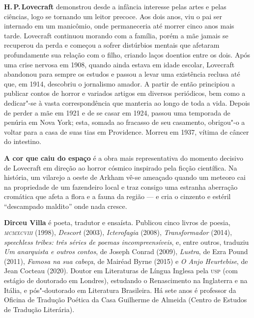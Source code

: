 \textbf{H.\,P.\,Lovecraft} demonstrou desde a infância interesse pelas artes e pelas ciências, logo se tornando um leitor precoce. Aos dois anos, viu o pai ser internado em um manicômio, onde permaneceria até morrer cinco anos mais tarde. Lovecraft continuou morando com a família, porém a mãe jamais se recuperou da perda e começou a sofrer distúrbios mentais que afetaram profundamente sua relação com o filho, criando laços doentios entre os dois. Após uma crise nervosa em 1908, quando ainda estava em idade escolar, Lovecraft abandonou para sempre os estudos e passou a levar uma existência reclusa até que, em 1914, descobriu o jornalismo amador. A partir de então principiou a publicar contos de horror e variados artigos em diversos periódicos, bem como a dedicar"-se à vasta correspondência que manteria ao longo de toda a vida. Depois de perder a mãe em 1921 e de se casar em 1924, passou uma temporada de penúria em Nova York; esta, somada ao fracasso de seu casamento, obrigou"-o a voltar para a casa de suas tias em Providence. Morreu em 1937, vítima de câncer do intestino.

\textbf{A cor que caiu do espaço} é a obra mais representativa do momento decisivo de Lovecraft em direção ao horror cósmico inspirado pela ficção científica. Na história, um vilarejo a oeste de Arkham vê-se ameaçado quando um meteoro cai na propriedade de um fazendeiro local e traz consigo uma estranha aberração cromática que afeta a flora e a fauna da região --- e cria o cinzento e estéril “descampado maldito” onde nada cresce.

\pagebreak

\textbf{Dirceu Villa} é poeta, tradutor e ensaísta. Publicou cinco livros de poesia, \emph{\textsc{mcmxcviii}} (1998), \emph{Descort} (2003), \emph{Icterofagia} (2008), \emph{Transformador} (2014), \emph{speechless tribes: três séries de poemas incompreensíveis}, e, entre outros, traduziu \emph{Um anarquista e outros contos}, de Joseph Conrad (2009), \emph{Lustra}, de Ezra Pound (2011), \emph{Famosa na sua cabeça}, de Mairéad Byrne (2015) e \emph{O Anjo Heurtebise}, de Jean Cocteau (2020). Doutor em Literaturas de Língua Inglesa pela \textsc{usp} (com estágio de doutorado em Londres), estudando o Renascimento na Inglaterra e na Itália, e pós"-doutorado em Literatura Brasileira. Há sete anos é professor da Oficina de Tradução Poética da Casa Guilherme de Almeida (Centro de Estudos de Tradução Literária).

\blankpage



